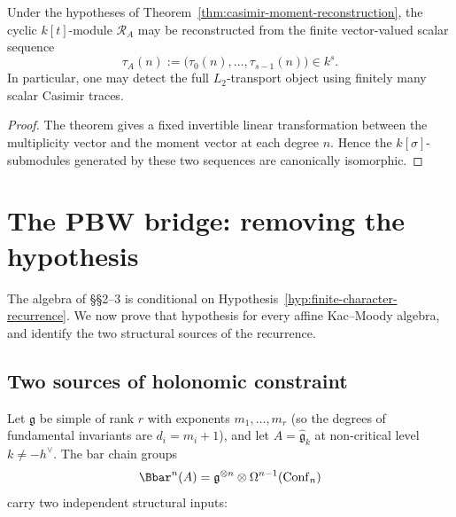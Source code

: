 \begin{corollary}
\ClaimStatusProvedHere
\label{cor:finite-scalar-probes}
Under the hypotheses of Theorem~\ref{thm:casimir-moment-reconstruction}, the cyclic \(k[t]\)-module \(\mathcal R_A\) may be reconstructed from the finite vector-valued scalar sequence
\[
\tau_A(n):=\bigl(\tau_0(n),\dots,\tau_{s-1}(n)\bigr)\in k^s.
\]
In particular, one may detect the full \(L_2\)-transport object using finitely many scalar Casimir traces.
\end{corollary}

\begin{proof}
The theorem gives a fixed invertible linear transformation between the multiplicity vector and the moment vector at each degree \(n\).
Hence the \(k[\sigma]\)-submodules generated by these two sequences are canonically isomorphic.
\end{proof}

\section{The PBW bridge: removing the hypothesis}

The algebra of \S\S2--3 is conditional on
Hypothesis~\ref{hyp:finite-character-recurrence}.
We now prove that hypothesis for every affine Kac--Moody algebra,
and identify the two structural sources of the recurrence.

\subsection{Two sources of holonomic constraint}

Let \(\mathfrak g\) be simple of rank \(r\) with exponents
\(m_1,\dots,m_r\) (so the degrees of fundamental invariants are
\(d_i=m_i+1\)), and let \(A=\widehat{\mathfrak g}_k\) at
non-critical level \(k\ne -h^\vee\).
The bar chain groups
\[
\Bbar^n(A)=\mathfrak g^{\otimes n}\otimes
\Omega^{n-1}(\operatorname{Conf}_n)
\]
carry two independent structural inputs:

